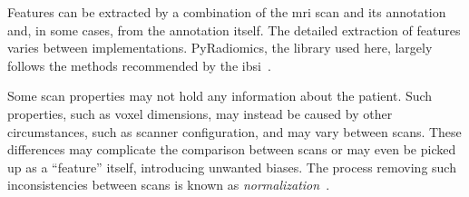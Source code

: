 Features can be extracted by a combination of the \ac{mri} scan and its 
annotation and, in some cases, from the annotation itself. The detailed 
extraction of features varies between implementations. PyRadiomics, the library 
used here, largely follows the methods recommended by the 
\ac{ibsi}~\cite{py_rad,ibsi_paper}.

Some scan properties may not hold any information about
the patient. Such properties, such as voxel dimensions, may instead be caused
by other circumstances, such as scanner configuration, and may vary between 
scans. These differences may complicate the comparison between scans or may 
even be picked up as a \enquote{feature} itself, introducing unwanted biases.
The process removing such inconsistencies between scans is known as 
\textit{normalization}~\cite{py_rad_docs}.








